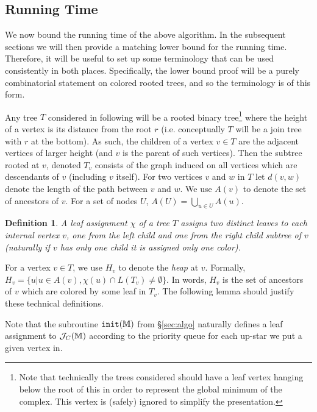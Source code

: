 \documentclass[11pt]{article}
\newtheorem{definition}[theorem]{Definition}
\theoremstyle{definition}
\newcommand{\cJ}{{\cal J}}
\newcommand{\MM}{\mathbb{M}}
\newcommand{\Sec}[1]{\hyperref[sec:#1]{\S\ref*{sec:#1}}} %
\newcommand{\init}{{\tt init}}
\newcommand{\jc}{\cJ_C}
\begin{document}
\subsection{Running Time}
\label{sec:runTime}

We now bound the running time of the above algorithm.  In the subsequent sections we will then provide a 
matching lower bound for the running time.  Therefore, it will be useful to set up some terminology that can 
be used consistently in both places.  Specifically, the lower bound proof will be a purely combinatorial 
statement on colored rooted trees, and so the terminology is of this form.

Any tree $T$ considered in following will be a rooted binary tree\footnote{Note 
that technically the trees considered should have a leaf vertex hanging below the root of this 
in order to represent the global minimum of the complex.  This vertex is 
(safely) ignored to simplify the presentation.} where the height of a vertex is its distance 
from the root $r$ (i.e. conceptually $T$ will be a join tree with $r$ at the bottom).  
As such, the children of a vertex $v\in T$ are the adjacent vertices of larger height
(and $v$ is the parent of such vertices).  Then the subtree rooted at $v$, denoted $T_v$ consists of the graph induced on all 
vertices which are descendants of $v$ (including $v$ itself).  For two vertices $v$ and $w$ in $T$ let $d(v,w)$ denote the 
length of the path between $v$ and $w$.
We use $A(v)$ to denote the set of ancestors of $v$.
For a set of nodes $U$, $A(U) = \bigcup_{u \in U} A(u)$.


\begin{definition}
 A \emph{leaf assignment} $\chi$ of a tree $T$ assigns \emph{two} distinct leaves to each internal vertex $v$,
 one from the left child and one from the right child subtree of $v$ (naturally if $v$ has only one child it is assigned 
 only one color).
\end{definition}

For a vertex $v\in T$, we use $H_v$ to denote the \emph{heap} at $v$.
Formally, $H_v = \{u | u \in A(v), \chi(u) \cap L(T_v) \neq \emptyset\}$.
In words, $H_v$ is the set of ancestors of $v$ which are colored by some leaf in $T_v$.
The following lemma should justify these technical definitions.

Note that the subroutine $\init(\MM)$ from \Sec{algo} naturally defines a leaf assignment to $\jc(\MM)$ 
according to the priority queue for each up-star we put a given vertex in.
\end{document}
